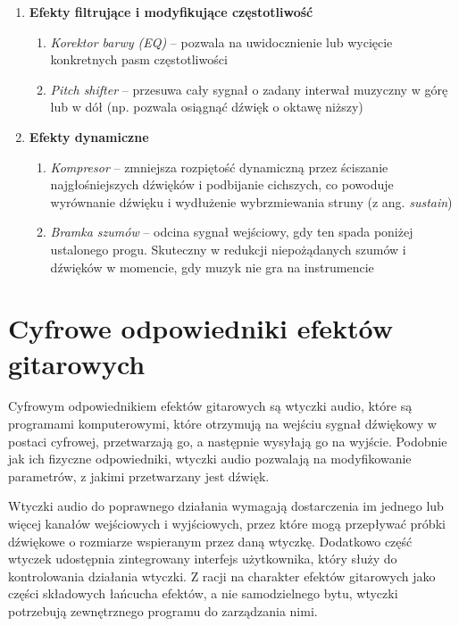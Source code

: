 \documentclass[12pt,a4paper]{report}
\begin{document}
\begin{enumerate}
\begin{enumerate}
        w różnych zamkniętych pomieszczeniach\cite{reverb}.
    \end{enumerate}
  \item \textbf{Efekty filtrujące i modyfikujące częstotliwość}
    \begin{enumerate}
      \item \textit{Korektor barwy (EQ)} -- pozwala na uwidocznienie
        lub wycięcie konkretnych pasm częstotliwości
      \item \textit{Pitch shifter} -- przesuwa cały sygnał o zadany
        interwał muzyczny w górę lub w dół (np. pozwala osiągnąć
        dźwięk o oktawę niższy)
    \end{enumerate}
  \item \textbf{Efekty dynamiczne}
    \begin{enumerate}
      \item \textit{Kompresor} -- zmniejsza rozpiętość dynamiczną
        przez ściszanie najgłośniejszych dźwięków i podbijanie
        cichszych\cite{compressor}, co powoduje wyrównanie dźwięku i wydłużenie
        wybrzmiewania struny (z ang. \textit{sustain})
      \item \textit{Bramka szumów} -- odcina sygnał wejściowy, gdy ten
        spada poniżej ustalonego progu\cite{noise_gate}. Skuteczny w redukcji
        niepożądanych szumów i dźwięków w momencie, gdy muzyk nie gra
        na instrumencie
    \end{enumerate}
\end{enumerate}

\section{Cyfrowe odpowiedniki efektów gitarowych}
Cyfrowym odpowiednikiem efektów gitarowych są wtyczki
audio\cite{audio_effects}, które są programami komputerowymi, które
otrzymują na wejściu sygnał dźwiękowy w postaci cyfrowej,
przetwarzają go, a następnie wysyłają go na wyjście. Podobnie jak
ich fizyczne odpowiedniki, wtyczki audio pozwalają na modyfikowanie
parametrów, z jakimi przetwarzany jest dźwięk.

Wtyczki audio do poprawnego działania wymagają dostarczenia im jednego
lub więcej kanałów wejściowych i wyjściowych, przez które
mogą przepływać próbki dźwiękowe o rozmiarze wspieranym przez daną
wtyczkę. Dodatkowo część wtyczek udostępnia zintegrowany interfejs
użytkownika, który służy do kontrolowania działania wtyczki. Z racji
na charakter efektów gitarowych jako części składowych łańcucha
efektów, a nie samodzielnego bytu, wtyczki potrzebują zewnętrznego
programu do zarządzania nimi.
\end{document}
